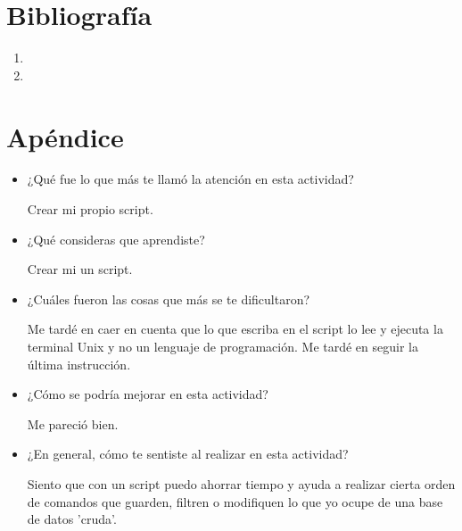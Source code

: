\documentclass[12pt]{article}
\begin{document}
\pagebreak
\section{Bibliograf\'ia}
\noindent

\begin{enumerate} [\hspace{16pt} 1.]
		\item 

		\item
\end{enumerate}

\section{Ap\'endice}
\begin{itemize}
\item  ¿Qué fue lo que más te llamó la atención en esta actividad?

Crear mi propio script. 

\item ¿Qué consideras que aprendiste?

Crear mi un script.

\item ¿Cuáles fueron las cosas que más se te dificultaron?

Me tard\'e en caer en cuenta que lo que escriba en el script lo lee y ejecuta la terminal Unix y no un lenguaje de programaci\'on. Me tard\'e en seguir la \'ultima instrucci\'on.

\item ¿Cómo se podría mejorar en esta actividad?

Me pareci\'o bien.

\item ¿En general, cómo te sentiste al realizar en esta actividad?

Siento que con un script puedo ahorrar tiempo y ayuda a realizar cierta orden de comandos que guarden, filtren o modifiquen lo que yo ocupe de una base de datos 'cruda'. 
\end{itemize}
\end{document}
